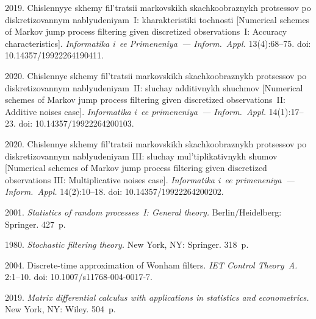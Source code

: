   \begin{multicols}{2}

\renewcommand{\bibname}{\protect\rmfamily References}

{\small\frenchspacing
 {%
 \begin{thebibliography}{99}

 2019. Chislennyye skhemy fil'tratsii mar\-kov\-skikh skachkoobraznykh protsessov po
 diskretizovannym nablyudeniyam~I:  kharakteristiki tochnosti [Numerical schemes of Markov jump process 
 filtering given discretized observations~I: 
 Accuracy characteristics]. \textit{Informatika i~ee Primeneniya~--- Inform.~Appl.}
 13(4):68--75.
  doi: 10.14357/19922264190411.

 2020. Chislennye skhemy fil'tratsii mar\-kov\-skikh skachkoobraznykh 
protsessov po diskretizovannym nablyudeniyam~II: sluchay additivnykh shuchmov 
 [Numerical schemes of Markov jump process filtering given discretized observations~II: Additive noises case].
 \textit{Informatika i~ee primeneniya~--- Inform.~Appl.}
 14(1):17--23. doi: 10.14357/19922264200103.

   2020. Chislennye skhemy fil'tratsii mar\-kov\-skikh skachkoobraznykh 
  protsessov po diskretizovannym nablyudeniyam III:  sluchay mul'tiplikativnykh shumov
  [Numerical schemes of Markov jump process filtering given
discretized observations III: Multiplicative noises case].
\textit{Informatika i~ee primeneniya~--- Inform.~Appl.}
14(2):10--18. doi: 10.14357/19922264200202.


  2001. \textit{Statistics of random processes~I: General theory.}  
 Berlin/Heidelberg: Springer. 427~p.
 {
 
 }
 
 
  1980. \textit{Stochastic filtering theory.}  New York, NY: Springer. 318~p.

 2004.
Discrete-time approximation of Wonham filters.
\textit{IET Control Theory~A.} 2:1--10.
doi: 10.1007/s11768-004-0017-7.

  2019.
\textit{Matrix differential calculus with applications in statistics and econometrics.}  
New York, NY: Wiley. 504~p.


\end{thebibliography}}}
\end{multicols}
